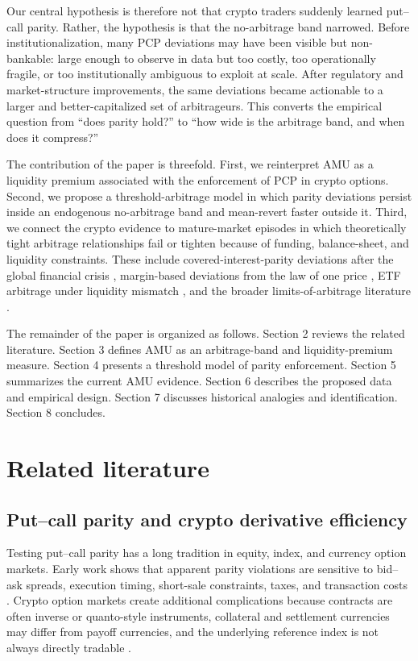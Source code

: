 \documentclass[12pt]{article}
\begin{document}
Our central hypothesis is therefore not that crypto traders suddenly learned put--call parity. Rather, the hypothesis is that the no-arbitrage band narrowed. Before institutionalization, many PCP deviations may have been visible but non-bankable: large enough to observe in data but too costly, too operationally fragile, or too institutionally ambiguous to exploit at scale. After regulatory and market-structure improvements, the same deviations became actionable to a larger and better-capitalized set of arbitrageurs. This converts the empirical question from ``does parity hold?'' to ``how wide is the arbitrage band, and when does it compress?''

The contribution of the paper is threefold. First, we reinterpret AMU as a liquidity premium associated with the enforcement of PCP in crypto options. Second, we propose a threshold-arbitrage model in which parity deviations persist inside an endogenous no-arbitrage band and mean-revert faster outside it. Third, we connect the crypto evidence to mature-market episodes in which theoretically tight arbitrage relationships fail or tighten because of funding, balance-sheet, and liquidity constraints. These include covered-interest-parity deviations after the global financial crisis \citep{du2018deviations}, margin-based deviations from the law of one price \citep{garleanu2011margin}, ETF arbitrage under liquidity mismatch \citep{pan2017etf}, and the broader limits-of-arbitrage literature \citep{shleifer1997limits}.

The remainder of the paper is organized as follows. Section 2 reviews the related literature. Section 3 defines AMU as an arbitrage-band and liquidity-premium measure. Section 4 presents a threshold model of parity enforcement. Section 5 summarizes the current AMU evidence. Section 6 describes the proposed data and empirical design. Section 7 discusses historical analogies and identification. Section 8 concludes.

\section{Related literature}

\subsection{Put--call parity and crypto derivative efficiency}

Testing put--call parity has a long tradition in equity, index, and currency option markets. Early work shows that apparent parity violations are sensitive to bid--ask spreads, execution timing, short-sale constraints, taxes, and transaction costs \citep{klemkosky1979put, nisbet1992put, kamara1995daily, el1998put, cremers2010deviations}. Crypto option markets create additional complications because contracts are often inverse or quanto-style instruments, collateral and settlement currencies may differ from payoff currencies, and the underlying reference index is not always directly tradable \citep{alexander2023crypto, lucic2024valuation}.
\end{document}
